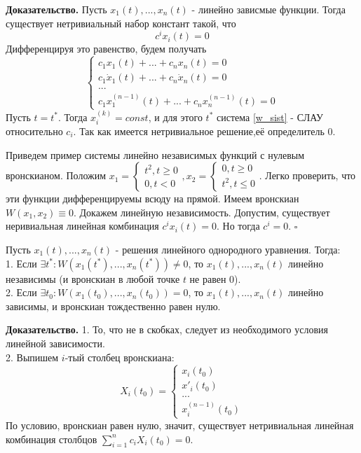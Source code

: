 \textbf{Доказательство.}  Пусть $x_1(t),...,x_n(t)$ - линейно зависмые 
функции. Тогда существует нетривиальный набор констант такой, что
$$c^ix_i(t)=0$$ 
Дифференцируя это равенство, будем получать
\begin{equation} \label{w_sist}
  \begin{cases}
    c_1x_1(t)+...+c_nx_n(t)=0\\
    c_1\dot x_1(t)+...+c_n\dot x_n(t)=0\\
    ...\\
    c_1x^{(n-1)}_1(t)+...+c_nx^{(n-1)}_n(t) = 0
\end{cases}  
\end{equation}
Пусть $t=t^*$. Тогда $x^{(k)}_i=const$, и для этого 
 $t^*$ система \ref{w_sist} - СЛАУ относительно $c_i$. Так как имеется 
нетривиальное решение,её определитель 0.

Приведем пример системы линейно независимых функций с нулевым 
вронскианом. Положим
$x_1=\begin{cases}   t^2,t\geqslant 0\\0,t<0 \end{cases},
x_2=\begin{cases} 0,t\geqslant 0\\t^2,t\leqslant 0 \end{cases}$.
Легко проверить, что эти функции дифференцируемы всюду на прямой. Имеем 
вронскиан $W(x_1,x_2)\equiv0$. Докажем линейную независимость. Допустим, 
существует неривиальная линейная комбинация $c^ix_i(t)=0$. Но тогда 
$c^i=0$. $\square$ \\

\begin{theor}
Пусть $x_1(t),...,x_n(t)$ - решения линейного однородного уравнения. Тогда:\\
1. Если  $\exists  t^*:W(x_1(t^*),...,x_n(t^*))\ne0$, то
$x_1(t),...,x_n(t)$ линейно независимы (и вронскиан в любой точке $t$ не 
равен 0).\\
2. Если $\exists t_0:W(x_1(t_0),...,x_n(t_0))=0$, то $x_1(t),...,x_n(t)$
линейно зависимы, и вронскиан тождественно равен нулю. 
\end{theor}
\textbf{Доказательство.}  
1. То, что не в скобках, следует из необходимого условия линейной 
зависимости.\\
2. Выпишем $i$-тый столбец вронскиана:
 $$X_i(t_0)=\begin{cases}
     x_i(t_0)\\x'_i(t_0)\\...\\x^{(n-1)}_i(t_0)
 \end{cases}$$
По условию, вронскиан равен нулю, значит, существует нетривиальная 
линейная комбинация столбцов $\sum\limits_{i=1}^{n} c_iX_i(t_0)=0$. 

